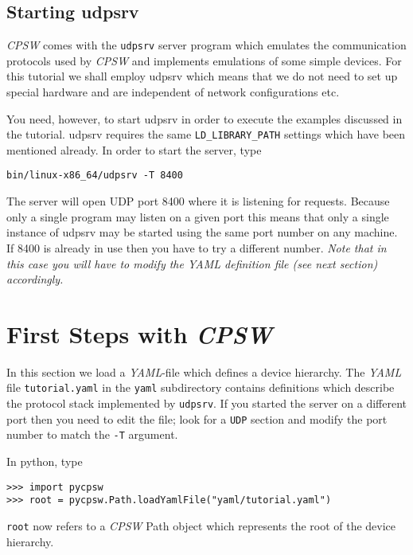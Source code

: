 \documentclass[10pt]{article}
\newcommand{\ita}[1]{\emph{#1}}
\newcommand{\cpsw}      {\ita {CPSW}}
\newcommand{\yaml}      {\ita {YAML}}
\newcommand{\Path}      {{Path}}
\newcommand{\py}        {python}
\newcommand{\udps}      {udpsrv}
\newcommand{\cod}[1] {{\tt#1}}
\newcommand{\tutyaml} {\cod{tutorial.yaml}}
\begin{document}
\subsection{Starting \udps}
\cpsw{} comes with the \cod{\udps} server program which emulates the communication
protocols used by \cpsw{} and implements emulations of some simple devices. For this
tutorial we shall employ \udps{} which means that we do not need to set up special
hardware and are independent of network configurations etc.

You need, however, to start \udps{} in order to execute the examples discussed in
the tutorial. \udps{} requires the same \cod{LD\_LIBRARY\_PATH} settings which have
been mentioned already. In order to start the server, type

\begin{verbatim}
bin/linux-x86_64/udpsrv -T 8400
\end{verbatim}

The server will open UDP port 8400 where it is listening for requests. Because
only a single program may listen on a given port this means that only a single
instance of \udps{} may be started using the same port number on any machine.
If 8400 is already in use then you have to try a different number. {\em Note
that in this case you will have to modify the YAML definition file
(see next section) accordingly.}


\section{First Steps with \cpsw}
\label{sec:firststeps}
In this section we load a \yaml{}-file which defines a device hierarchy.
The \yaml{} file \tutyaml{} in the \cod{yaml} subdirectory contains
definitions which describe the protocol stack implemented by \cod{\udps}.
If you started the server on a different port then you need to edit the
file; look for a \cod{UDP} section and modify the port number to match
the \cod{-T} argument.

In \py{}, type

\begin{verbatim}
>>> import pycpsw
>>> root = pycpsw.Path.loadYamlFile("yaml/tutorial.yaml")
\end{verbatim}

\cod{root} now refers to a \cpsw{} \Path{} object which represents
the root of the device hierarchy.
\end{document}
